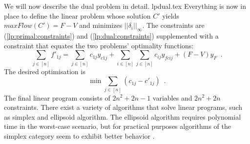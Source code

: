   We will now describe the dual problem in detail.
  {lpdual.tex}
  Everything is now in place to define the linear problem whose solution $C'$ yields $maxFlow\left(C'\right) = F - V$ and
  minimizes $||\delta_i||_\infty$. The constraints are (\ref{lp:primal:constraints}) and (\ref{lp:dual:constraints})
  supplemented with a constraint that equates the two problems' optimality functions:
  \begin{equation*}
    \sum\limits_{j \in \left[n\right]}f'_{1j} = \sum\limits_{j \in \left[n\right]}c_{1j}y_{c1j} +
    \sum\limits_{i \in \left[n\right]}\sum\limits_{j \in \left[n\right]}c_{ij}y_{fcij} + \left(F - V\right)y_F \enspace.
  \end{equation*}
  The desired optimisation is
  \begin{equation*}
    \min{\sum\limits_{j \in \left[n\right]}\left(c_{1j} - c'_{1j}\right)} \enspace.
  \end{equation*}
  The final linear program consists of $2n^2 + 2n - 1$ variables and $2n^2 + 2n$ constraints. There exist a variety of
  algorithms that solve linear programs, such as simplex and ellipsoid algorithm. The ellipsoid algorithm requires polynomial
  time in the worst-case scenario, but for practical purposes algorithms of the simplex category seem to exhibit better
  behavior \cite{it}.
